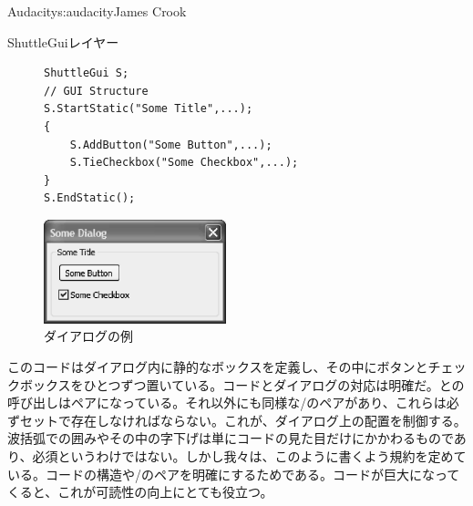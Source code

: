 \begin{aosachapter}{Audacity}{s:audacity}{James Crook}
\begin{aosasect1}{ShuttleGuiレイヤー}
\begin{figure}[h!]
\begin{minipage}[b]{7cm}
\begin{verbatim}
ShuttleGui S;
// GUI Structure
S.StartStatic("Some Title",...);
{
    S.AddButton("Some Button",...);
    S.TieCheckbox("Some Checkbox",...);
}
S.EndStatic();
\end{verbatim}
\end{minipage}
\begin{minipage}[b]{7cm}
\centering
\includegraphics[width={150pt}]{../images/audacity/SomeDialog.eps}
\end{minipage}
\caption{ダイアログの例}
\label{fig.aud.2}
\end{figure}

このコードはダイアログ内に静的なボックスを定義し、その中にボタンとチェックボックスをひとつずつ置いている。コードとダイアログの対応は明確だ。との呼び出しはペアになっている。それ以外にも同様な/のペアがあり、これらは必ずセットで存在しなければならない。これが、ダイアログ上の配置を制御する。波括弧での囲みやその中の字下げは単にコードの見た目だけにかかわるものであり、必須というわけではない。しかし我々は、このように書くよう規約を定めている。コードの構造や/のペアを明確にするためである。コードが巨大になってくると、これが可読性の向上にとても役立つ。


\end{aosasect1}
\end{aosachapter}
